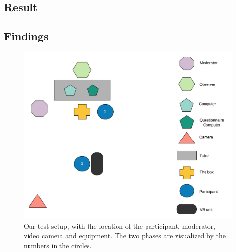 \subsection{Result}

\subsection{Findings}


\begin{figure}[H]
	\centering
	\includegraphics[width=1\linewidth]{figure/Evaluation/Test1.png}
	\caption{Our test setup, with the location of the participant, moderator, video camera and equipment. The two phases are visualized by the numbers in the circles.}
	\label{fig:test1}
\end{figure}